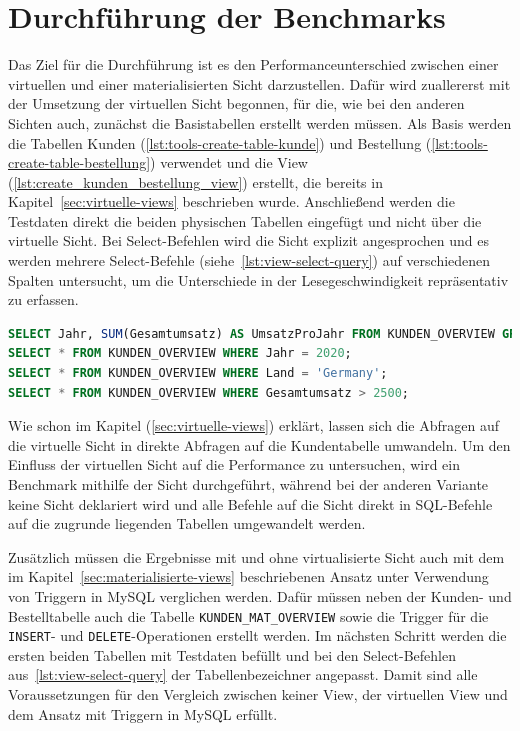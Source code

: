 \section{Durchführung der Benchmarks}\label{sec:durchfuhrung-der-benchmarks}

Das Ziel für die Durchführung ist es den Performanceunterschied zwischen einer virtuellen und einer materialisierten Sicht darzustellen.
Dafür wird zuallererst mit der Umsetzung der virtuellen Sicht begonnen, für die, wie bei den anderen Sichten auch, zunächst die Basistabellen erstellt werden müssen.
Als Basis werden die Tabellen Kunden (\ref{lst:tools-create-table-kunde}) und Bestellung (\ref{lst:tools-create-table-bestellung}) verwendet und die View (\ref{lst:create_kunden_bestellung_view}) erstellt, die bereits in Kapitel~\ref{sec:virtuelle-views} beschrieben wurde.
Anschließend werden die Testdaten direkt die beiden physischen Tabellen eingefügt und nicht über die virtuelle Sicht.
Bei Select-Befehlen wird die Sicht explizit angesprochen und es werden mehrere Select-Befehle (siehe~\ref{lst:view-select-query}) auf verschiedenen Spalten untersucht, um die Unterschiede in der Lesegeschwindigkeit repräsentativ zu erfassen.

\vspace{-5pt}
\begin{lstlisting}[language=SQL,caption=Select-Abfragen auf alle Spalten der View,label={lst:view-select-query}]
SELECT Jahr, SUM(Gesamtumsatz) AS UmsatzProJahr FROM KUNDEN_OVERVIEW GROUP BY Jahr;
SELECT * FROM KUNDEN_OVERVIEW WHERE Jahr = 2020;
SELECT * FROM KUNDEN_OVERVIEW WHERE Land = 'Germany';
SELECT * FROM KUNDEN_OVERVIEW WHERE Gesamtumsatz > 2500;
\end{lstlisting}
\vspace{-5pt}

Wie schon im Kapitel (\ref{sec:virtuelle-views}) erklärt, lassen sich die Abfragen auf die virtuelle Sicht in direkte Abfragen auf die Kundentabelle umwandeln.
Um den Einfluss der virtuellen Sicht auf die Performance zu untersuchen, wird ein Benchmark mithilfe der Sicht durchgeführt, während bei der anderen Variante keine Sicht deklariert wird und alle Befehle auf die Sicht direkt in SQL-Befehle auf die zugrunde liegenden Tabellen umgewandelt werden.

Zusätzlich müssen die Ergebnisse mit und ohne virtualisierte Sicht auch mit dem im Kapitel~\ref{sec:materialisierte-views} beschriebenen Ansatz unter Verwendung von Triggern in MySQL verglichen werden.
Dafür müssen neben der Kunden- und Bestelltabelle auch die Tabelle \texttt{KUNDEN\_MAT\_OVERVIEW} sowie die Trigger für die \texttt{INSERT}- und \texttt{DELETE}-Operationen erstellt werden.
Im nächsten Schritt werden die ersten beiden Tabellen mit Testdaten befüllt und bei den Select-Befehlen aus~\ref{lst:view-select-query} der Tabellenbezeichner angepasst.
Damit sind alle Voraussetzungen für den Vergleich zwischen keiner View, der virtuellen View und dem Ansatz mit Triggern in MySQL erfüllt.

